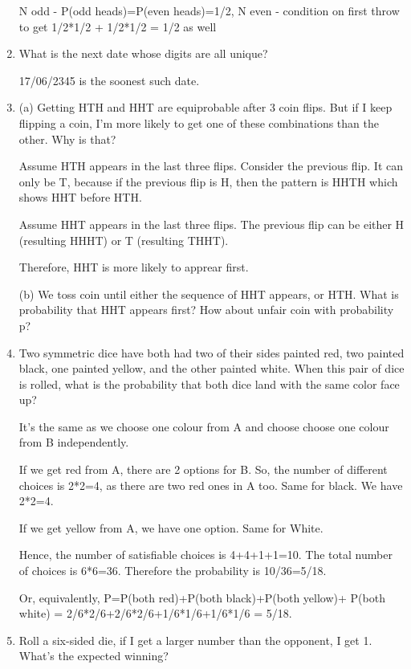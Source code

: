 \documentclass{article}
\begin{document}
\begin{enumerate}
    N odd - P(odd heads)=P(even heads)=1/2, N even - condition on first throw to get 1/2*1/2 + 1/2*1/2 = 1/2 as well

    \item What is the next date whose digits are all unique?

    17/06/2345 is the soonest such date.

    \item (a) Getting HTH and HHT are equiprobable after 3 coin flips. But if I keep flipping a coin, I'm more likely to get one of these combinations than the other. Why is that?

    Assume HTH appears in the last three flips. Consider the previous flip. It can only be T, because if the previous flip is H, then the pattern is HHTH which shows HHT before HTH. 

    Assume HHT appears in the last three flips. The previous flip can be either H (resulting HHHT) or T (resulting THHT). 

    Therefore, HHT is more likely to apprear first. 

    (b) We toss coin until either the sequence of HHT appears, or HTH. What is probability that HHT appears first? How about unfair coin with probability p?
    

    

    \item Two symmetric dice have both had two of their sides painted red, two painted black, one painted yellow, and the other painted white. When this pair of dice is rolled, what is the probability that both dice land with the same color face up?

    It's the same as we choose one colour from A and choose choose one colour from B independently. 

    If we get red from A, there are 2 options for B. So, the number of different choices is 2*2=4, as there are two red ones in A too. Same for black. We have 2*2=4.

    If we get yellow from A, we have one option. Same for White.

    Hence, the number of satisfiable choices is 4+4+1+1=10. The total number of choices is 6*6=36. Therefore the probability is 10/36=5/18. 

    Or, equivalently, P=P(both red)+P(both black)+P(both yellow)+ P(both white) = 2/6*2/6+2/6*2/6+1/6*1/6+1/6*1/6 = 5/18.

    \item Roll a six-sided die, if I get a larger number than the opponent, I get 1. What's the expected winning?


\end{enumerate}
\end{document}
